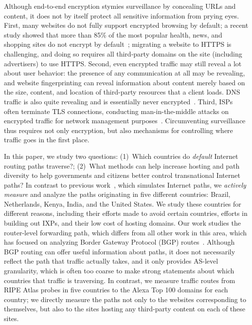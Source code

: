 Although end-to-end encryption stymies surveillance by
concealing URLs and content, it does not by itself protect all sensitive
information from prying eyes. First, many websites do not fully support
encrypted browsing by default; a recent study showed that more than 85\%
of the most popular health, news, and shopping sites do not encrypt by
default~\cite{what_isps_can_see}; migrating a website to HTTPS is
challenging, and doing so requires all third-party domains on the site
(including advertisers) to use HTTPS.  Second, even encrypted traffic
may still reveal a lot about user behavior: the presence of any
communication at all may be revealing, and website fingerprinting can
reveal information about content merely based on the size, content, and
location of third-party resources that a client loads. DNS traffic is
also quite revealing and is essentially never
encrypted~\cite{what_isps_can_see}.  Third, ISPs often terminate TLS
connections, conducting man-in-the-middle attacks on encrypted traffic
for network management purposes~\cite{mitm_isp}. Circumventing
surveillance thus requires not only encryption, but also mechanisms
for controlling where traffic goes in the first place.

In this paper, we study two questions: (1)~Which countries do {\em
  default} Internet routing paths traverse?; (2)~What methods can help
increase hosting and path diversity to help governments and citizens
better control transnational Internet paths?  In contrast to previous
work~\cite{karlin2009nation}, which simulates Internet paths, we
\textit{actively measure} and analyze the paths originating in five
different countries: Brazil, Netherlands, Kenya, India, and the United
States.  We study these countries for different reasons, including their
efforts made to avoid certain countries, efforts in building out IXPs,
and their low cost of hosting domains.  Our work studies the
router-level forwarding path, which differs from all other work in this
area, which has focused on analyzing Border Gateway Protocol
(BGP) routes~\cite{karlin2009nation,shah2015characterizing}.  Although
BGP routing can offer useful information about paths, it does not
necessarily reflect the path that traffic actually takes, and it only
provides AS-level granularity, which is often too coarse to make strong
statements about which countries that traffic is traversing.  In
contrast, we measure traffic routes from RIPE Atlas probes in five
countries to the Alexa Top 100 domains for each country; we directly
measure the paths not only to the websites corresponding to
themselves, but also to the sites hosting any third-party content on
each of these sites.


